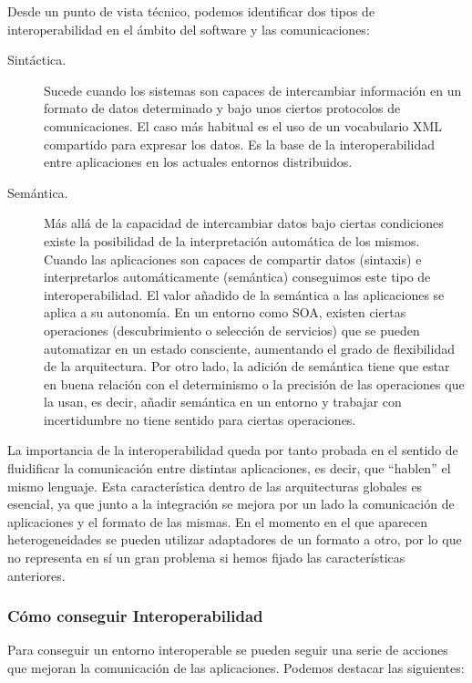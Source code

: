 Desde un punto de vista técnico, podemos identificar dos tipos de interoperabilidad en el ámbito del software y las comunicaciones:
\begin{description}
\item [Sintáctica.] Sucede cuando los sistemas son capaces de intercambiar información 
en un formato de datos determinado y bajo unos ciertos protocolos de
comunicaciones. El caso más habitual es el uso de un vocabulario XML compartido
para expresar los datos. Es la base de la interoperabilidad entre aplicaciones en
los actuales entornos distribuidos.
\item [Semántica.] Más allá de la capacidad de intercambiar datos bajo ciertas
condiciones existe la posibilidad de la interpretación automática de los
mismos. Cuando las aplicaciones son capaces de compartir datos (sintaxis) e
interpretarlos automáticamente (semántica) conseguimos este tipo de
interoperabilidad. El valor añadido de la semántica a las aplicaciones se
aplica a su autonomía. En un entorno como SOA, existen ciertas operaciones
(descubrimiento o selección de servicios) que se pueden automatizar en un estado
consciente, aumentando el grado de flexibilidad de la arquitectura. Por otro
lado, la adición de semántica tiene que estar en buena relación con el
determinismo o la precisión de las operaciones que la usan, es decir, añadir
semántica en un entorno y trabajar con incertidumbre no tiene sentido para
ciertas operaciones. 
\end{description}

La importancia de la interoperabilidad queda por tanto probada en el
sentido de fluidificar la comunicación entre distintas aplicaciones, es decir,
que ``hablen'' el mismo lenguaje. Esta característica dentro de las
arquitecturas globales es esencial, ya que junto a la integración se mejora por un
lado la comunicación de aplicaciones y el formato de las mismas. En el
momento en el que aparecen heterogeneidades se pueden utilizar adaptadores de un
formato a otro, por lo que no representa en sí un gran problema si hemos fijado
las características anteriores.

\subsubsection{Cómo conseguir Interoperabilidad}
Para conseguir un entorno interoperable se pueden seguir una serie de acciones que mejoran la comunicación de las aplicaciones. Podemos
destacar las siguientes:

